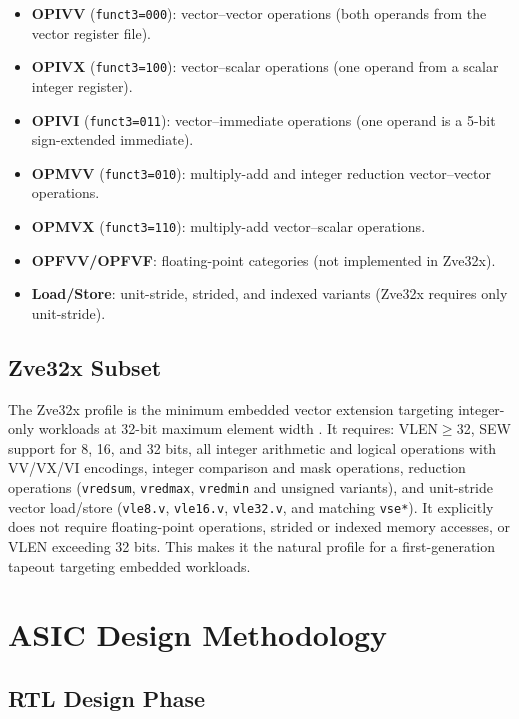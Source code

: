 \begin{itemize}
  \item \textbf{OPIVV} (\texttt{funct3=000}): vector--vector operations (both operands
        from the vector register file).
  \item \textbf{OPIVX} (\texttt{funct3=100}): vector--scalar operations (one operand
        from a scalar integer register).
  \item \textbf{OPIVI} (\texttt{funct3=011}): vector--immediate operations (one operand
        is a 5-bit sign-extended immediate).
  \item \textbf{OPMVV} (\texttt{funct3=010}): multiply-add and integer reduction
        vector--vector operations.
  \item \textbf{OPMVX} (\texttt{funct3=110}): multiply-add vector--scalar operations.
  \item \textbf{OPFVV/OPFVF}: floating-point categories (not implemented in Zve32x).
  \item \textbf{Load/Store}: unit-stride, strided, and indexed variants (Zve32x
        requires only unit-stride).
\end{itemize}

\subsection{Zve32x Subset}

The Zve32x profile is the minimum embedded vector extension targeting integer-only
workloads at 32-bit maximum element width \cite{rvv-spec-1-0}. It requires:
VLEN$\geq$32, SEW support for 8, 16, and 32 bits, all integer arithmetic and logical
operations with VV/VX/VI encodings, integer comparison and mask operations, reduction
operations (\texttt{vredsum}, \texttt{vredmax}, \texttt{vredmin} and unsigned variants),
and unit-stride vector load/store (\texttt{vle8.v}, \texttt{vle16.v}, \texttt{vle32.v},
and matching \texttt{vse*}). It explicitly does not require floating-point operations,
strided or indexed memory accesses, or VLEN exceeding 32 bits. This makes it the
natural profile for a first-generation tapeout targeting embedded workloads.

\section{ASIC Design Methodology}
\label{sec:asic-methodology}

\subsection{RTL Design Phase}

